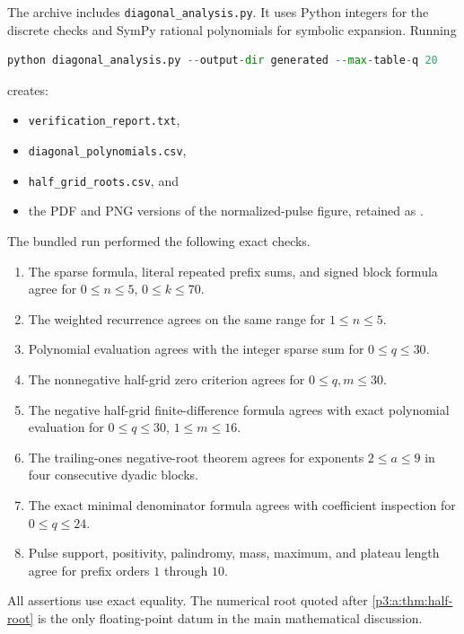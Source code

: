 \documentclass[11pt,oneside]{article}
\numberwithin{equation}{section}
\theoremstyle{definition}
\theoremstyle{remark}
\begin{document}
The archive includes \texttt{diagonal\_analysis.py}.  It uses Python integers
for the discrete checks and SymPy rational polynomials for symbolic
expansion.  Running
\begin{lstlisting}[language=Python]
python diagonal_analysis.py --output-dir generated --max-table-q 20
\end{lstlisting}
creates:
\begin{itemize}[leftmargin=2em]
\item \texttt{verification\_report.txt},
\item \texttt{diagonal\_polynomials.csv},
\item \texttt{half\_grid\_roots.csv}, and
\item the PDF and PNG versions of the normalized-pulse figure, retained as .
\end{itemize}

The bundled run performed the following exact checks.

\begin{enumerate}[leftmargin=2.2em]
\item The sparse formula, literal repeated prefix sums, and signed block
formula agree for \(0\leq n\leq5\), \(0\leq k\leq70\).
\item The weighted recurrence agrees on the same range for
\(1\leq n\leq5\).
\item Polynomial evaluation agrees with the integer sparse sum for
\(0\leq q\leq30\).
\item The nonnegative half-grid zero criterion agrees for
\(0\leq q,m\leq30\).
\item The negative half-grid finite-difference formula agrees with exact
polynomial evaluation for \(0\leq q\leq30\), \(1\leq m\leq16\).
\item The trailing-ones negative-root theorem agrees for exponents
\(2\leq a\leq9\) in four consecutive dyadic blocks.
\item The exact minimal denominator formula agrees with coefficient
inspection for \(0\leq q\leq24\).
\item Pulse support, positivity, palindromy, mass, maximum, and plateau length
agree for prefix orders \(1\) through \(10\).
\end{enumerate}

All assertions use exact equality.  The numerical root quoted after
\cref{p3:a:thm:half-root} is the only floating-point datum in the main
mathematical discussion.
\end{document}
